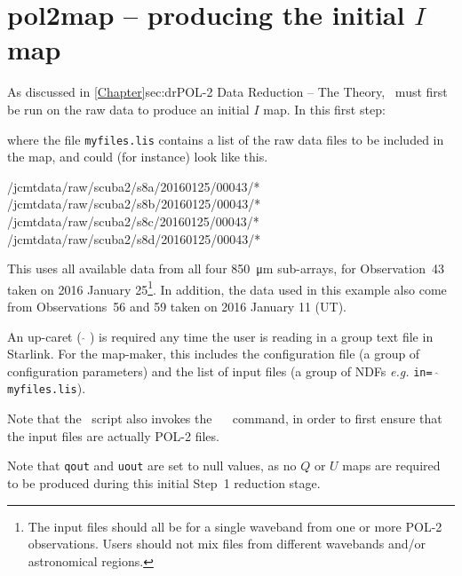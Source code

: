 \begin{terminalv}
\end{terminalv}


\section{pol2map -- producing the initial $I$ map}
\label{sec:how-step1}

As discussed in \cref{Chapter}{sec:dr}{POL-2 Data Reduction -- The
  Theory}, \poltwomap\ must first be run on the raw data to produce an
initial $I$ map.  In this first step:

\begin{terminalv}
\end{terminalv}

where the file \texttt{myfiles.lis} contains a list of the raw data
files to be included in the map, and could (for instance) look like
this.

\begin{terminalv}
/jcmtdata/raw/scuba2/s8a/20160125/00043/*
/jcmtdata/raw/scuba2/s8b/20160125/00043/*
/jcmtdata/raw/scuba2/s8c/20160125/00043/*
/jcmtdata/raw/scuba2/s8d/20160125/00043/*
\end{terminalv}

This uses all available data from all four \SI{850}{\micro\metre} sub-arrays, for
  Observation~43 taken on 2016 January 25\footnote{The input files
  should all be for a single waveband from one or more POL-2
  observations. Users should not mix files from different wavebands and/or
  astronomical regions.}. In addition, the data used in this example
  also come from Observations~56 and 59 taken on 2016 January 11 (UT).

\begin{tip}
  An up-caret ( $ \hat{} $ ) is required any time the user is reading in
  a group text file in Starlink. For the map-maker, this includes the
  configuration file (a group of configuration parameters) and the
  list of input files (a group of NDFs \emph{e.g.} \texttt{in= $
    \hat{} $ myfiles.lis}).

  Note that the \poltwomap\ script also invokes the \ \smurf\
   command, in order to 
  first ensure that the input files are actually POL-2 files.
\end{tip}

Note that \texttt{qout} and \texttt{uout} are set to null values, as no
$Q$ or $U$ maps are required to be produced during this initial Step~1
reduction stage.

